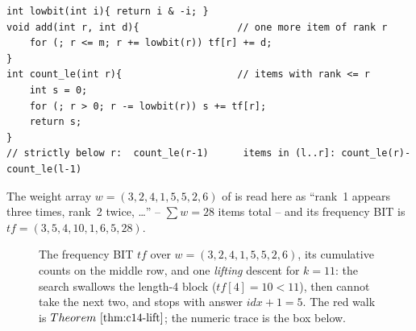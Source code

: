 \begin{lstlisting}[caption={the frequency BIT: add a copy of a rank, count how many sit at or below a rank}, label={lst:c14-freq}]
int lowbit(int i){ return i & -i; }
void add(int r, int d){                 // one more item of rank r
    for (; r <= m; r += lowbit(r)) tf[r] += d;
}
int count_le(int r){                    // items with rank <= r
    int s = 0;
    for (; r > 0; r -= lowbit(r)) s += tf[r];
    return s;
}
// strictly below r:  count_le(r-1)      items in (l..r]: count_le(r)-count_le(l-1)
\end{lstlisting}

The weight array \(w=(3,2,4,1,5,5,2,6)\) of  is read here
as ``rank~1 appears three times, rank~2 twice, \ldots'' -- \(\sum w=28\)
items total -- and its frequency BIT is
\(\mathit{tf}=(3,5,4,10,1,6,5,28)\).

\begin{figure}[H]
\centering
{}
\caption{The frequency BIT \(\mathit{tf}\) over \(w=(3,2,4,1,5,5,2,6)\), its
cumulative counts on the middle row, and one \emph{lifting} descent for
\(k{=}11\): the search swallows the length-4 block (\(\mathit{tf}[4]{=}10<11\)),
then cannot take the next two, and stops with answer \(\mathit{idx}{+}1=5\).
The red walk is \(\thmref{c14-lift}\); the numeric trace is the box below.}
\label{fig:c14-lift}
\end{figure}

